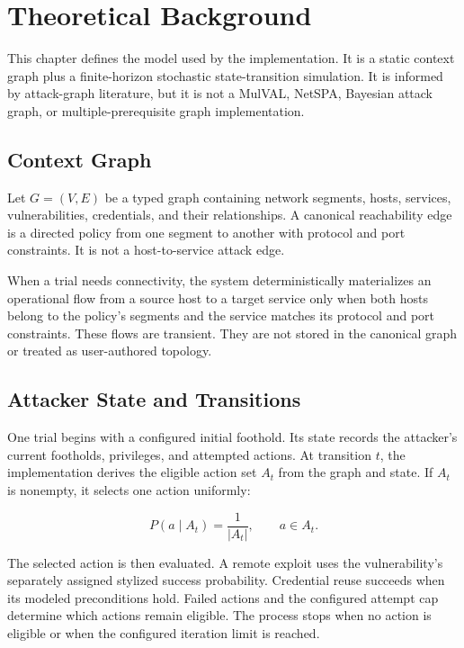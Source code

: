 \chapter{Theoretical Background}
\label{ch:theory}

This chapter defines the model used by the implementation. It is a static context graph plus a finite-horizon stochastic state-transition simulation. It is informed by attack-graph literature, but it is not a MulVAL, NetSPA, Bayesian attack graph, or multiple-prerequisite graph implementation.

\section{Context Graph}

Let $G = (V, E)$ be a typed graph containing network segments, hosts, services, vulnerabilities, credentials, and their relationships. A canonical reachability edge is a directed policy from one segment to another with protocol and port constraints. It is not a host-to-service attack edge.

When a trial needs connectivity, the system deterministically materializes an operational flow from a source host to a target service only when both hosts belong to the policy's segments and the service matches its protocol and port constraints. These flows are transient. They are not stored in the canonical graph or treated as user-authored topology.

\section{Attacker State and Transitions}

One trial begins with a configured initial foothold. Its state records the attacker's current footholds, privileges, and attempted actions. At transition $t$, the implementation derives the eligible action set $A_t$ from the graph and state. If $A_t$ is nonempty, it selects one action uniformly:

\[
P(a \mid A_t) = \frac{1}{|A_t|}, \qquad a \in A_t.
\]

The selected action is then evaluated. A remote exploit uses the vulnerability's separately assigned stylized success probability. Credential reuse succeeds when its modeled preconditions hold. Failed actions and the configured attempt cap determine which actions remain eligible. The process stops when no action is eligible or when the configured iteration limit is reached.

